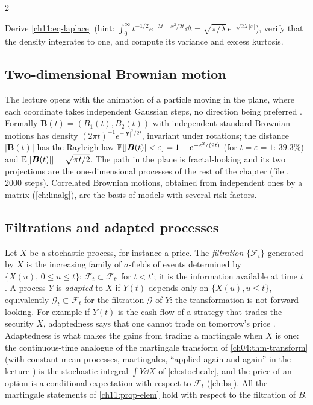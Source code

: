\begin{paracol}{2}
\begin{exercise}\label{ch11:ex-laplace}
Derive \eqref{ch11:eq-laplace} (hint: $\int_0^\infty t^{-1/2}e^{-\lambda t-x^2/2t}\dd t=\sqrt{\pi/\lambda}\,e^{-\sqrt{2\lambda}|x|}$), verify that the density integrates to one, and compute its variance and excess kurtosis.
\end{exercise}

\subsection{Two-dimensional Brownian motion}\label{ch11:sec-2d}
The lecture opens with the animation of a particle moving in the plane, where each coordinate takes independent Gaussian steps,
no direction being preferred . Formally $\bm B(t)=(B_1(t),B_2(t))$ with independent standard Brownian motions has density
$(2\pi t)^{-1}e^{-|\bm y|^2/2t}$, invariant under rotations; the distance $|\bm B(t)|$ has the Rayleigh law
$\mathbb{P}[|\bm B(t)|<\varepsilon]=1-e^{-\varepsilon^2/(2t)}$ (for $t=\varepsilon=1$: $39.3\%$) and $\mathbb{E}[|\bm B(t)|]=\sqrt{\pi t/2}$.
The path in the plane is fractal-looking and its two projections are the one-dimensional processes of the rest of the chapter (file , $2000$ steps).
Correlated Brownian motions, obtained from independent ones by a matrix (\cref{ch:linalg}), are the basis of models with several risk factors.

\subsection{Filtrations and adapted processes}\label{ch11:sec-adapted}
Let $X$ be a stochastic process, for instance a price. The \emph{filtration} $\{\mathcal F_t\}$ generated by $X$ is the increasing family of $\sigma$-fields of
events determined by $\{X(u),\,0\le u\le t\}$: $\mathcal F_t\subset\mathcal F_{t'}$ for $t<t'$; it is the information available at time $t$
. A process $Y$ is \emph{adapted} to $X$ if $Y(t)$ depends only on $\{X(u),u\le t\}$, equivalently
$\mathcal G_t\subset\mathcal F_t$ for the filtration $\mathcal G$ of $Y$: the transformation is not forward-looking. For example if $Y(t)$
is the cash flow of a strategy that trades the security $X$, adaptedness says that one cannot trade on tomorrow's price
. Adaptedness is what makes the gains from trading a martingale when $X$ is one: the continuous-time
analogue of the martingale transform of \cref{ch04:thm-transform} (with constant-mean processes, martingales, ``applied again and again'' in the
lecture ) is the stochastic integral $\int Y\dd X$ of \cref{ch:stochcalc}, and the price of an option is a conditional
expectation with respect to $\mathcal F_t$ (\cref{ch:bs}). All the martingale statements of \cref{ch11:prop-elem} hold with respect to the filtration of $B$.


\end{paracol}
